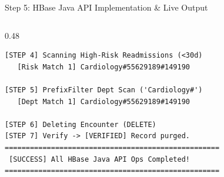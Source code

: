 \documentclass[aspectratio=169]{beamer}
\begin{document}
\begin{frame}[fragile,shrink=5]{Step 5: HBase Java API Implementation \& Live Output}
\begin{columns}[T]
\begin{column}{0.48\textwidth}
\begin{lstlisting}[basicstyle=\ttfamily\fontsize{4.5}{5.5}\selectfont]
[STEP 4] Scanning High-Risk Readmissions (<30d)
   [Risk Match 1] Cardiology#55629189#149190

[STEP 5] PrefixFilter Dept Scan ('Cardiology#')
   [Dept Match 1] Cardiology#55629189#149190

[STEP 6] Deleting Encounter (DELETE)
[STEP 7] Verify -> [VERIFIED] Record purged.
===================================================
 [SUCCESS] All HBase Java API Ops Completed!
===================================================
            \end{lstlisting}
        \end{column}
    \end{columns}
\end{frame}

\end{document}
